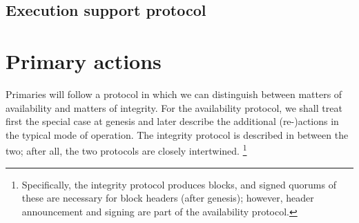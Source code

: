 \documentclass[%
dvipsnames
]{article}
\theoremstyle{definition}
\let\oldendnote\endnote
\renewcommand{\endnote}[2][ ]{%
  \ifthenelse{\equal{#1}{ }}%
  {\marginnote{\oldendnote{#2}}}%
  {\marginnote{\oldendnote[#1]{#2}}}%
}
\renewcommand{\todo}[2][]{}
\renewcommand{\endnote}[2][]{}
\newcounter{old\v,\r}\setcounter{old\v,\r}{0}%
\begin{document}
\todo[caption={}]{%
  concerning “triggering” the header construction,
  there are the following points
  \\
  1. when a the triggering signing request is \emph{received} by a primary,
  we might need to “wait” for the corresponding worker hashes
  \\
  2. new signing for more recent rounds make old ones obsolete
  \\
  3. what are the incentives for speedy signing ?
}\endnote{%
  On speedy signing incentives:
  \begin{itemize}
  \item as a validator, I want primarily \emph{my} blocks signed
  \item
    So, why should I sign \emph{your} header?!
    \begin{itemize}
    \item It comes even with the storage commitment for my workers!
    \item Actually, if “everybody” else is signing, I am still gonna be fine !!!
    \end{itemize}

    Thus, having a signature as part of an availability certificate should give
    some kind of reward!
  \end{itemize}
  On the other hand,
  it is natural to collect signatures for the availability certificate
  on a “first come, first served” basis
}




\subsection{Execution support protocol}
\label{sec:exe-supp-protocol}

\todo{todo!}
\section{Primary actions}
\label{sec:primary-actions}

Primaries will follow a protocol %
in which we can distinguish between matters of availability %
and matters of integrity. %
For the availability protocol,
we shall treat first the special case at genesis 
and later describe the additional (re-)actions
in the typical mode of operation. %
The integrity protocol is described in between the two; %
after all, the two protocols are closely intertwined.\xspace%
\footnote{%
  Specifically, %
  the integrity protocol produces blocks, %
  and signed quorums of these are necessary for block headers (after genesis); %
  however, %
  header announcement and signing are part of the availability protocol. %
}
\end{document}
